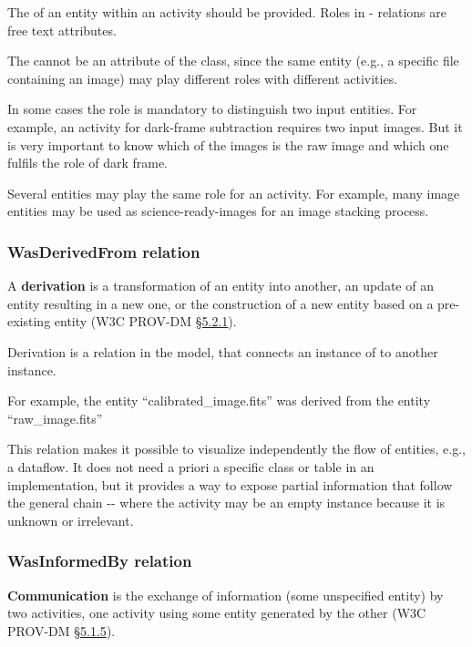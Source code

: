 The  of an entity within an activity should be provided.
Roles in - relations are free text attributes.

The  cannot be an attribute of the  class, since the same entity (e.g., a specific file containing an image) may play different roles with different activities.

In some cases the role is mandatory to distinguish two input entities. For example, an activity for dark-frame subtraction requires two input images. But it is very important to know which of the images is the raw image and which one fulfils the role of dark frame.

Several entities may play the same role for an activity. For example, many image entities may be used as science-ready-images for an image stacking process.



\subsubsection{WasDerivedFrom relation}

A \textbf{derivation} is a transformation of an entity into another, an update of an entity resulting in a new one, or the construction of a new entity based on a pre-existing entity (W3C PROV-DM \href{https://www.w3.org/TR/prov-dm/#term-Derivation}{\S5.2.1}).

Derivation is a relation  in the model, that connects an instance of  to another instance.

For example, the entity ``calibrated\_image.fits'' was derived from the entity ``raw\_image.fits''

This relation makes it possible to visualize independently the flow of entities, e.g., a dataflow. It does not need a priori a specific class or table in an implementation, but it provides a way to expose partial information that follow the general chain -- where the activity may be an empty instance because it is unknown or irrelevant.


\subsubsection{WasInformedBy relation}

\textbf{Communication} is the exchange of information (some unspecified entity) by two activities, one activity using some entity generated by the other (W3C PROV-DM \href{https://www.w3.org/TR/prov-dm/#term-Communication}{\S5.1.5}).

